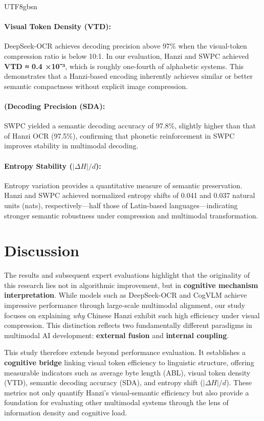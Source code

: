 \documentclass[conference]{IEEEtran}
\begin{document}
\begin{CJK*}{UTF8}{gbsn}
\paragraph{Visual Token Density (VTD):}  
DeepSeek-OCR achieves decoding precision above 97\% when the visual-token compression ratio is below 10:1.  
In our evaluation, Hanzi and SWPC achieved \textbf{VTD ≈ 0.4 ×10⁻³}, which is roughly one-fourth of alphabetic systems.  
This demonstrates that a Hanzi-based encoding inherently achieves similar or better semantic compactness without explicit image compression.

\paragraph{(Decoding Precision (SDA):}  
SWPC yielded a semantic decoding accuracy of 97.8\%, slightly higher than that of Hanzi OCR (97.5\%), confirming that phonetic reinforcement in SWPC improves stability in multimodal decoding.

\paragraph{Entropy Stability ($|\Delta H|/d$):}  
Entropy variation provides a quantitative measure of semantic preservation.  
Hanzi and SWPC achieved normalized entropy shifts of 0.041 and 0.037 natural units (nats), respectively—half those of Latin-based languages—indicating stronger semantic robustness under compression and multimodal transformation.

\section{Discussion}
\label{sec:discussion}

The results and subsequent expert evaluations highlight that the originality of this research lies not in algorithmic improvement, but in \textbf{cognitive mechanism interpretation}. While models such as DeepSeek-OCR \cite{wei2025deepseek} and CogVLM \cite{wang2024cogvlm} achieve impressive performance through large-scale multimodal alignment, our study focuses on explaining \textit{why} Chinese Hanzi exhibit such high efficiency under visual compression. This distinction reflects two fundamentally different paradigms in multimodal AI development: \textbf{external fusion} and \textbf{internal coupling}.

This study therefore extends beyond performance evaluation. It establishes a \textbf{cognitive bridge} linking visual token efficiency to linguistic structure, offering measurable indicators such as average byte length (ABL), visual token density (VTD), semantic decoding accuracy (SDA), and entropy shift ($|\Delta H|/d$). These metrics not only quantify Hanzi’s visual-semantic efficiency but also provide a foundation for evaluating other multimodal systems through the lens of information density and cognitive load.


\end{CJK*}
\end{document}
